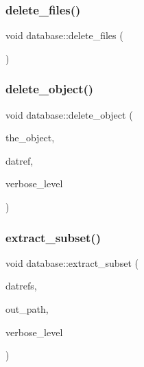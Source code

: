 \mbox{\label{classdatabase_a3cdd5549da793e4b4f44e175eabe050e}} 
\subsubsection{\texorpdfstring{delete\+\_\+files()}{delete\_files()}}
{\footnotesize\ttfamily void database\+::delete\+\_\+files (\begin{DoxyParamCaption}{ }\end{DoxyParamCaption})}

\mbox{\label{classdatabase_a69f061ffa820d1926718dafad5f5513c}} 
\subsubsection{\texorpdfstring{delete\+\_\+object()}{delete\_object()}}
{\footnotesize\ttfamily void database\+::delete\+\_\+object (\begin{DoxyParamCaption}\item[{\mbox{\hyperlink{class_vector}{Vector}} \&}]{the\+\_\+object,  }\item[{\mbox{\hyperlink{galois_8h_ac94af6544c710549c9fca744fd510395}{U\+I\+N\+T4}}}]{datref,  }\item[{\mbox{\hyperlink{galois_8h_a09fddde158a3a20bd2dcadb609de11dc}{I\+NT}}}]{verbose\+\_\+level }\end{DoxyParamCaption})}

\mbox{\label{classdatabase_abeb9113b3b9f544afe25bd16fd69662d}} 
\subsubsection{\texorpdfstring{extract\+\_\+subset()}{extract\_subset()}}
{\footnotesize\ttfamily void database\+::extract\+\_\+subset (\begin{DoxyParamCaption}\item[{\mbox{\hyperlink{class_vector}{Vector}} \&}]{datrefs,  }\item[{\mbox{\hyperlink{galois_8h_ab6cc7b4aeb6ea31aba2b3fbfc83ff5e6}{B\+Y\+TE}} $\ast$}]{out\+\_\+path,  }\item[{\mbox{\hyperlink{galois_8h_a09fddde158a3a20bd2dcadb609de11dc}{I\+NT}}}]{verbose\+\_\+level }\end{DoxyParamCaption})}


